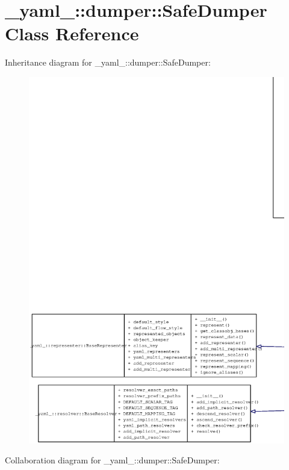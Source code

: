 \section{\_\-yaml\_\-::dumper::SafeDumper Class Reference}
\label{class__yaml___1_1dumper_1_1SafeDumper}
Inheritance diagram for \_\-yaml\_\-::dumper::SafeDumper:\nopagebreak
\begin{figure}[H]
\begin{center}
\leavevmode
\includegraphics[width=400pt]{class__yaml___1_1dumper_1_1SafeDumper__inherit__graph}
\end{center}
\end{figure}
Collaboration diagram for \_\-yaml\_\-::dumper::SafeDumper:\nopagebreak
